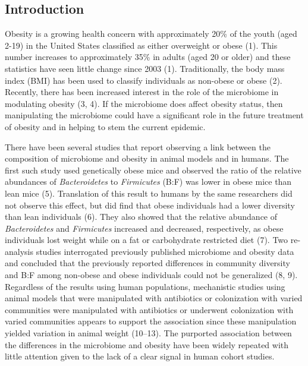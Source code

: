 \documentclass[12pt,]{article}
\begin{document}
\newpage

\subsection{Introduction}\label{introduction}

Obesity is a growing health concern with approximately 20\% of the youth
(aged 2-19) in the United States classified as either overweight or
obese (1). This number increases to approximately 35\% in adults (aged
20 or older) and these statistics have seen little change since 2003
(1). Traditionally, the body mass index (BMI) has been used to classify
individuals as non-obese or obese (2). Recently, there has been
increased interest in the role of the microbiome in modulating obesity
(3, 4). If the microbiome does affect obesity status, then manipulating
the microbiome could have a significant role in the future treatment of
obesity and in helping to stem the current epidemic.

There have been several studies that report observing a link between the
composition of microbiome and obesity in animal models and in humans.
The first such study used genetically obese mice and observed the ratio
of the relative abundances of \emph{Bacteroidetes} to \emph{Firmicutes}
(B:F) was lower in obese mice than lean mice (5). Translation of this
result to humans by the same researchers did not observe this effect,
but did find that obese individuals had a lower diversity than lean
individuals (6). They also showed that the relative abundance of
\emph{Bacteroidetes} and \emph{Firmicutes} increased and decreased,
respectively, as obese individuals lost weight while on a fat or
carbohydrate restricted diet (7). Two re-analysis studies interrogated
previously published microbiome and obesity data and concluded that the
previously reported differences in community diversity and B:F among
non-obese and obese individuals could not be generalized (8, 9).
Regardless of the results using human populations, mechanistic studies
using animal models that were manipulated with antibiotics or
colonization with varied communities were manipulated with antibiotics
or underwent colonization with varied communities appears to support the
association since these manipulation yielded variation in animal weight
(10--13). The purported association between the differences in the
microbiome and obesity have been widely repeated with little attention
given to the lack of a clear signal in human cohort studies.
\end{document}
